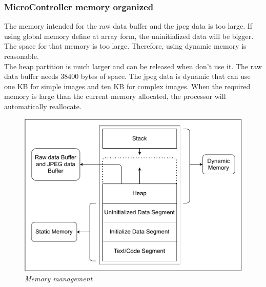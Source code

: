 \documentclass[D:/Latex/Internship/Report/Latex/Report.tex]{subfiles}
\begin{document}
			\subsubsection{MicroController memory organized}
			\label{subsubsec:MicroController Memory}
				The memory intended for the raw data buffer and the jpeg data is too large. If using global memory define at array form, the uninitialized data will be bigger. The space for that memory is too large. Therefore, using dynamic memory is reasonable. \\
				The heap partition is much larger and can be released when don't use it. The raw data buffer needs 38400 bytes of space. The jpeg data is dynamic that can use one KB for simple images and ten KB for complex images. When the required memory is large than the current memory allocated, the processor will automatically reallocate. 
				\begin{figure}[ht!]
					\centering
					\includegraphics[scale = 0.9]{Figure/Memory_Management.pdf}
					\caption{\it Memory management}
					\label{fig:Memory Management}
				\end{figure}
\end{document}
